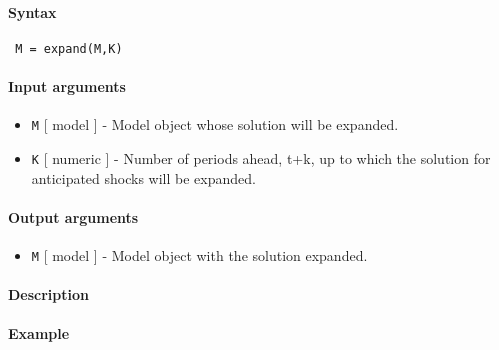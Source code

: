 


	\paragraph{Syntax}
 
 \begin{verbatim}
 M = expand(M,K)
 \end{verbatim}
 
 \paragraph{Input arguments}
 
 \begin{itemize}
 \item
   \texttt{M} {[} model {]} - Model object whose solution will be
   expanded.
 \item
   \texttt{K} {[} numeric {]} - Number of periods ahead, t+k, up to which
   the solution for anticipated shocks will be expanded.
 \end{itemize}
 
 \paragraph{Output arguments}
 
 \begin{itemize}
 \item
   \texttt{M} {[} model {]} - Model object with the solution expanded.
 \end{itemize}
 
 \paragraph{Description}
 
 \paragraph{Example}


